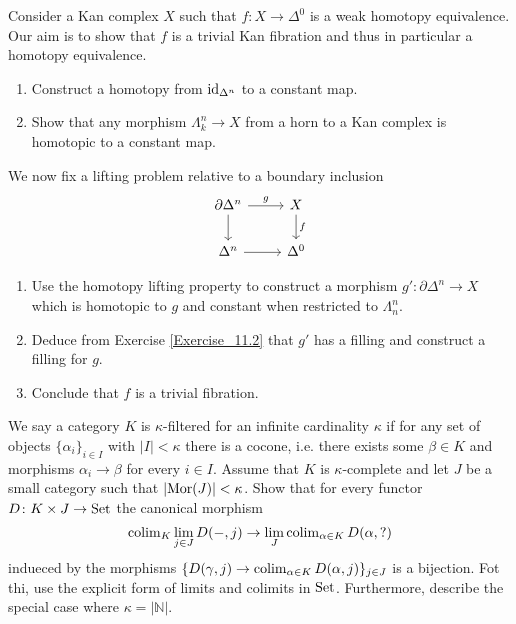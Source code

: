 \begin{Exercise}
    Consider a Kan complex $ X $ such that $ f \colon X  \to \Delta^0 $ is a weak homotopy equivalence.
    Our aim is to show that $ f $ is a trivial Kan fibration and thus in particular a homotopy equivalence.
    \begin{enumerate}[label=(\alph*)]
        \item 
        Construct a homotopy from $ \operatorname{id}_{\Delta^n}$ to a constant map.

        \item 
        Show that any morphism $ \Lambda_k^n \to X $ from a horn to a Kan complex is homotopic to a constant map.
    \end{enumerate}

    We now fix a lifting problem relative to a boundary inclusion
    \[
    \begin{tikzcd}
        \partial \Delta^n
        \ar[r, "g"]
        \ar[d]
        &
        X
        \ar[d, "f"]
        \\
        \Delta^n
        \ar[r]
        &
        \Delta^0
    \end{tikzcd}
    \]

    \begin{enumerate}[resume]
        \item 
        Use the homotopy lifting property to construct a morphism $ g' \colon \partial \Delta^n \to X $ which is homotopic to $ g $ and constant when restricted to $ \Lambda_n^n$.

        \item 
        Deduce from Exercise \cref{Exercise_11.2} that $ g' $ has a filling and construct a filling for $ g $.

        \item 
        Conclude that $ f $ is a trivial fibration.
    \end{enumerate}

\end{Exercise}

\begin{Exercise}
\label{Exercise commuting finite limits with colimits in set}
    We say a category $ K $ is $ \kappa$-filtered for an infinite cardinality $ \kappa $ if for any set of objects $ \{ \alpha_i \}_{ i \in I}$ with $ \lvert I \rvert < \kappa $ there is a cocone, i.e. there exists some $ \beta \in K $ and morphisms $ \alpha_i \to \beta $ for every $ i \in I $.
    Assume that $ K $ is $ \kappa $-complete and let $ J $ be a small category such that $ \lvert \operatorname{Mor} ( J ) \rvert < \kappa $.
    Show that for every functor $ D \colon K \times J \to \operatorname{Set} $ the canonical morphism 
    \[
        \operatorname{colim}_K \lim_{j \in J} D ( - , j ) \to \lim_J \operatorname{colim}_{\alpha \in K } D ( \alpha ,  ? )
    \]
    indueced by the morphisms $ \{ D ( \gamma , j ) \to \operatorname{colim}_{ \alpha \in K } D ( \alpha , j ) \}_{ j \in J }$ is a bijection. Fot thi, use the explicit form of limits and colimits in $ \operatorname{Set}$.
    Furthermore, describe the special case where $ \kappa = \lvert \mathbb{ N } \rvert$.
\end{Exercise}

